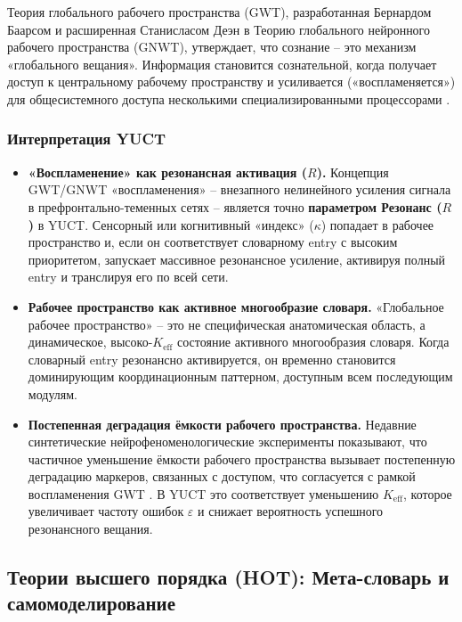\documentclass[12pt,a4paper]{article}
\begin{document}
	Теория глобального рабочего пространства (GWT), разработанная Бернардом Баарсом и расширенная Станисласом Деэн в Теорию глобального нейронного рабочего пространства (GNWT), утверждает, что сознание – это механизм «глобального вещания». Информация становится сознательной, когда получает доступ к центральному рабочему пространству и усиливается («воспламеняется») для общесистемного доступа несколькими специализированными процессорами \cite{Baars1988, Dehaene2014}.
	
	\subsubsection*{Интерпретация YUCT}
	\begin{itemize}
		\item \textbf{«Воспламенение» как резонансная активация (\(R\)).} Концепция GWT/GNWT «воспламенения» – внезапного нелинейного усиления сигнала в префронтально-теменных сетях – является точно \textbf{параметром Резонанс (\(R\))} в YUCT. Сенсорный или когнитивный «индекс» (\(\kappa\)) попадает в рабочее пространство и, если он соответствует словарному entry с высоким приоритетом, запускает массивное резонансное усиление, активируя полный entry и транслируя его по всей сети.
		\item \textbf{Рабочее пространство как активное многообразие словаря.} «Глобальное рабочее пространство» – это не специфическая анатомическая область, а динамическое, высоко-\(K_{\mathrm{eff}}\) состояние активного многообразия словаря. Когда словарный entry резонансно активируется, он временно становится доминирующим координационным паттерном, доступным всем последующим модулям.
		\item \textbf{Постепенная деградация ёмкости рабочего пространства.} Недавние синтетические нейрофеноменологические эксперименты показывают, что частичное уменьшение ёмкости рабочего пространства вызывает постепенную деградацию маркеров, связанных с доступом, что согласуется с рамкой воспламенения GWT \cite{Phua2026}. В YUCT это соответствует уменьшению \(K_{\mathrm{eff}}\), которое увеличивает частоту ошибок \(\varepsilon\) и снижает вероятность успешного резонансного вещания.
	\end{itemize}
	
	\subsection{Теории высшего порядка (HOT): Мета-словарь и самомоделирование}
	
\end{document}
